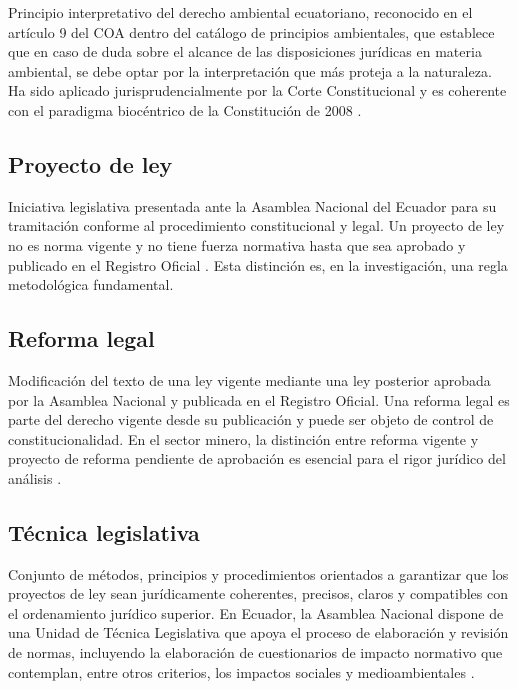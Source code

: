Principio interpretativo del derecho ambiental ecuatoriano, reconocido en el artículo 9 del COA dentro del catálogo de principios ambientales, que establece que en caso de duda sobre el alcance de las disposiciones jurídicas en materia ambiental, se debe optar por la interpretación que más proteja a la naturaleza. Ha sido aplicado jurisprudencialmente por la Corte Constitucional y es coherente con el paradigma biocéntrico de la Constitución de 2008 \parencite{coa_2017,cce_1149_19_jp_21}.

\subsection{Proyecto de ley}

Iniciativa legislativa presentada ante la Asamblea Nacional del Ecuador para su tramitación conforme al procedimiento constitucional y legal. Un proyecto de ley no es norma vigente y no tiene fuerza normativa hasta que sea aprobado y publicado en el Registro Oficial \parencite{cre_2008}. Esta distinción es, en la investigación, una regla metodológica fundamental.

\subsection{Reforma legal}

Modificación del texto de una ley vigente mediante una ley posterior aprobada por la Asamblea Nacional y publicada en el Registro Oficial. Una reforma legal es parte del derecho vigente desde su publicación y puede ser objeto de control de constitucionalidad. En el sector minero, la distinción entre reforma vigente y proyecto de reforma pendiente de aprobación es esencial para el rigor jurídico del análisis \parencite{ley_reformatoria_mineria_2013,ley_fortalecimiento_2026}.

\subsection{Técnica legislativa}

Conjunto de métodos, principios y procedimientos orientados a garantizar que los proyectos de ley sean jurídicamente coherentes, precisos, claros y compatibles con el ordenamiento jurídico superior. En Ecuador, la Asamblea Nacional dispone de una Unidad de Técnica Legislativa que apoya el proceso de elaboración y revisión de normas, incluyendo la elaboración de cuestionarios de impacto normativo que contemplan, entre otros criterios, los impactos sociales y medioambientales \parencite{manual_tecnica_legislativa_an,cre_2008}.

